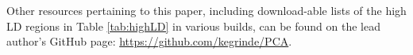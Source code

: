 \documentclass[12pt]{article}
\newcommand{\add}[1]{{\color{red}{[... #1 ...]}}}
\begin{document}
Other resources pertaining to this paper, including download-able lists of the high LD regions in Table \ref{tab:highLD} in various builds, can be found on the lead author's GitHub page: \href{https://github.com/kegrinde/PCA}{https://github.com/kegrinde/PCA}.



%
\end{document}
